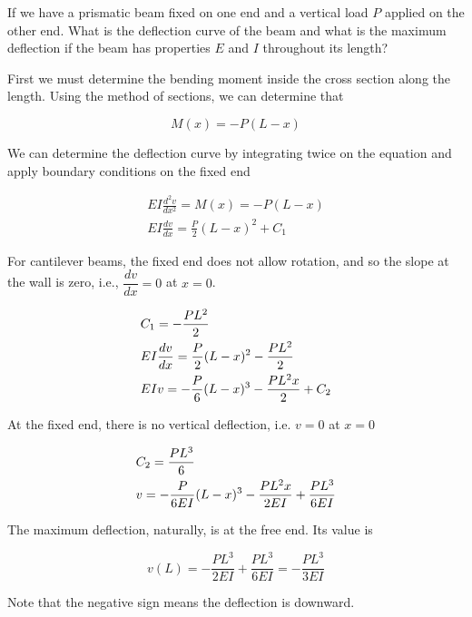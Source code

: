 \documentclass[
10pt,
a4paper,
openany,
svgnames,
]{book} %
\begin{document}
\begin{example} \label{example: cantilever beam deflection}
  If we have a prismatic beam fixed on one end and a vertical load $P$ applied on the other end. What is the deflection curve of the beam and what is the maximum deflection if the beam has properties $E$ and $I$ throughout its length?

  \begin{figure}[H]
    \centering
  \end{figure}
  
\end{example}
\begin{solution}
First we must determine the bending moment inside the cross section along the length. Using the method of sections, we can determine that

\[M(x) =  - P(L - x)\]	

We can determine the deflection curve by integrating twice on the equation and apply boundary conditions on the fixed end

\begin{gather*}
  EI\frac{d^2v}{dx^2} = M(x) =  - P(L - x) \\
  EI\frac{dv}{dx} = \frac{P}{2}(L - x)^2 + C_1
\end{gather*}

For cantilever beams, the fixed end does not allow rotation, and so the slope at the wall is zero, i.e., $\dfrac{dv}{dx} = 0$ at $x = 0$.

\begin{gather*}
  C_1 =  - \frac{PL^2}{2} \hfill \\
  EI\frac{dv}{dx} = \frac{P}{2}(L - x)^2 - \frac{PL^2}{2} \hfill \\
  EIv =  - \frac{P}{6}{(L - x)^3} - \frac{PL^2x}{2} + C_2 \hfill
\end{gather*}

At the fixed end, there is no vertical deflection, i.e. $v = 0$ at $x = 0$

\begin{gather*}
  C_2 = \frac{PL^3}{6} \hfill \\
  v =  - \frac{P}{6EI}(L - x)^3 - \frac{PL^2x}{2EI} + \frac{PL^3}{6EI} \hfill \\ 
\end{gather*}

The maximum deflection, naturally, is at the free end. Its value is

\[v(L) =  - \frac{PL^3}{2EI} + \frac{PL^3}{6EI} =  - \frac{PL^3}{3EI}\]

Note that the negative sign means the deflection is downward.
\end{solution}
\end{document}
